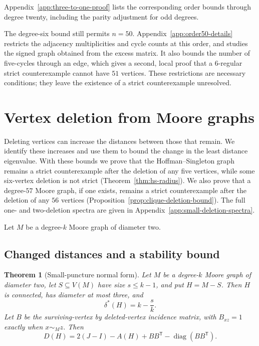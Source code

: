 \documentclass[a4paper,10pt,reqno]{amsart}
\theoremstyle{plain}
\newtheorem{theorem}{Theorem}[section]
\theoremstyle{definition}
\theoremstyle{remark}
\newcommand{\resultbox}[1]{\boxed{#1}}
\begin{document}
Appendix~\ref{app:three-to-one-proof} lists the corresponding order bounds
through degree twenty, including the parity adjustment for odd degrees.

The degree-six bound still permits \(n=50\).
Appendix~\ref{app:order50-details} restricts the adjacency multiplicities
and cycle counts at this order, and studies the signed graph obtained
from the excess matrix. It also bounds the number of five-cycles through an
edge, which gives a second, local proof that a \(6\)-regular strict
counterexample cannot have \(51\) vertices. These restrictions are
necessary conditions;
they leave the existence of a strict counterexample unresolved.

\section{Vertex deletion from Moore graphs}\label{sec:punctures}

Deleting vertices can increase the distances between those that remain.
We identify these increases and use them to bound the change in the least
distance eigenvalue. With these bounds we prove that the Hoffman--Singleton
graph remains a strict counterexample after the deletion of any five
vertices, while some six-vertex deletion is not strict
(Theorem~\ref{thm:hs-radius}). We also prove that a degree-\(57\) Moore
graph, if one exists, remains a strict counterexample after the deletion of
any \(56\) vertices (Proposition~\ref{prop:clique-deletion-bound}). The full one- and two-deletion spectra are given in
Appendix~\ref{app:small-deletion-spectra}.

Let \(M\) be a degree-\(k\) Moore graph of diameter two.

\subsection{Changed distances and a stability bound}

\begin{theorem}[Small-puncture normal form]\label{thm:small-puncture}
Let \(M\) be a degree-\(k\) Moore graph of diameter two, let
\(S\subseteq V(M)\) have size \(s\le k-1\), and put \(H=M-S\).  Then \(H\)
is connected, has diameter at most three, and
\[
 \resultbox{\delta^*(H)=k-\frac{s}{k}.}
\]
Let \(B\) be the surviving-vertex by deleted-vertex incidence matrix, with
\(B_{xz}=1\) exactly when \(x\sim_M z\).  Then
\[
 \resultbox{
 D(H)=2(J-I)-A(H)+BB^{\mathsf T}
 -\operatorname{diag}(BB^{\mathsf T}).
 }
\]
\end{theorem}
\end{document}
